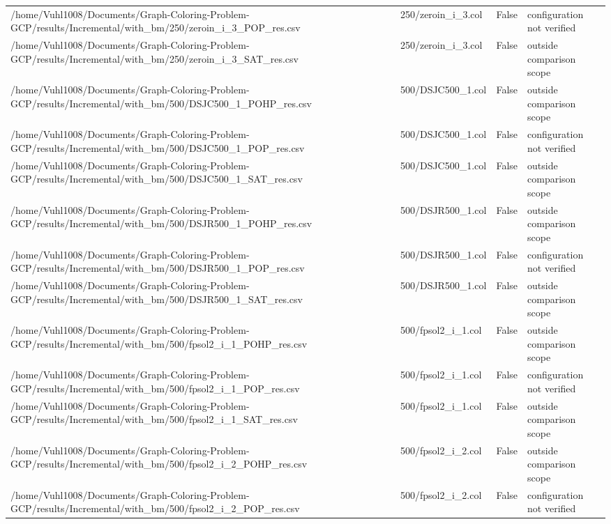 \begin{table}[htbp]
\begin{tabular}{llll}
/home/Vuhl1008/Documents/Graph-Coloring-Problem-GCP/results/Incremental/with\_bm/250/zeroin\_i\_3\_POP\_res.csv & 250/zeroin\_i\_3.col & False & configuration not verified \\
/home/Vuhl1008/Documents/Graph-Coloring-Problem-GCP/results/Incremental/with\_bm/250/zeroin\_i\_3\_SAT\_res.csv & 250/zeroin\_i\_3.col & False & outside comparison scope \\
/home/Vuhl1008/Documents/Graph-Coloring-Problem-GCP/results/Incremental/with\_bm/500/DSJC500\_1\_POHP\_res.csv & 500/DSJC500\_1.col & False & outside comparison scope \\
/home/Vuhl1008/Documents/Graph-Coloring-Problem-GCP/results/Incremental/with\_bm/500/DSJC500\_1\_POP\_res.csv & 500/DSJC500\_1.col & False & configuration not verified \\
/home/Vuhl1008/Documents/Graph-Coloring-Problem-GCP/results/Incremental/with\_bm/500/DSJC500\_1\_SAT\_res.csv & 500/DSJC500\_1.col & False & outside comparison scope \\
/home/Vuhl1008/Documents/Graph-Coloring-Problem-GCP/results/Incremental/with\_bm/500/DSJR500\_1\_POHP\_res.csv & 500/DSJR500\_1.col & False & outside comparison scope \\
/home/Vuhl1008/Documents/Graph-Coloring-Problem-GCP/results/Incremental/with\_bm/500/DSJR500\_1\_POP\_res.csv & 500/DSJR500\_1.col & False & configuration not verified \\
/home/Vuhl1008/Documents/Graph-Coloring-Problem-GCP/results/Incremental/with\_bm/500/DSJR500\_1\_SAT\_res.csv & 500/DSJR500\_1.col & False & outside comparison scope \\
/home/Vuhl1008/Documents/Graph-Coloring-Problem-GCP/results/Incremental/with\_bm/500/fpsol2\_i\_1\_POHP\_res.csv & 500/fpsol2\_i\_1.col & False & outside comparison scope \\
/home/Vuhl1008/Documents/Graph-Coloring-Problem-GCP/results/Incremental/with\_bm/500/fpsol2\_i\_1\_POP\_res.csv & 500/fpsol2\_i\_1.col & False & configuration not verified \\
/home/Vuhl1008/Documents/Graph-Coloring-Problem-GCP/results/Incremental/with\_bm/500/fpsol2\_i\_1\_SAT\_res.csv & 500/fpsol2\_i\_1.col & False & outside comparison scope \\
/home/Vuhl1008/Documents/Graph-Coloring-Problem-GCP/results/Incremental/with\_bm/500/fpsol2\_i\_2\_POHP\_res.csv & 500/fpsol2\_i\_2.col & False & outside comparison scope \\
/home/Vuhl1008/Documents/Graph-Coloring-Problem-GCP/results/Incremental/with\_bm/500/fpsol2\_i\_2\_POP\_res.csv & 500/fpsol2\_i\_2.col & False & configuration not verified \\

\end{tabular}
\end{table}
